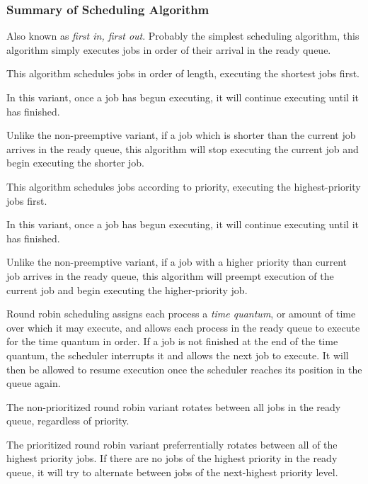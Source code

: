 \documentclass[12pt,letterpaper]{article}
\begin{document}
			\subsubsection{Summary of Scheduling Algorithm}
			\begin{description}[leftmargin=4cm, style=multiline]
					\item[First come, first served]{Also known as \textit{first in, first out}. Probably the simplest scheduling algorithm, this algorithm simply executes jobs in order of their arrival in the ready queue.}
					\item[Shortest job first]{This algorithm schedules jobs in order of length, executing the shortest jobs first.}
						\begin{description}[style=nextline, font=\normalfont\itshape]
							\item[non-preemptive]{In this variant, once a job has begun executing, it will continue executing until it has finished.}
							\item[preemptive]{Unlike the non-preemptive variant, if a job which is shorter than the current job arrives in the ready queue, this algorithm will stop executing the current job and begin executing the shorter job.}
						\end{description}
					\item[Priority]{This algorithm schedules jobs according to priority, executing the highest-priority jobs first.}
						\begin{description}[style=nextline, font=\normalfont\itshape]
							\item[non-preemptive]{In this variant, once a job has begun executing, it will continue executing until it has finished.}
							\item[preemptive]{Unlike the non-preemptive variant, if a job with a higher priority than current job arrives in the ready queue, this algorithm will preempt execution of the current job and begin executing the higher-priority job.}
						\end{description}
					\item[Round robin]{Round robin scheduling assigns each process a \textit{time quantum}, or amount of time over which it may execute, and allows each process in the ready queue to execute for the time quantum in order. If a job is not finished at the end of the time quantum, the scheduler interrupts it and allows the next job to execute. It will then be allowed to resume execution once the scheduler reaches its position in the queue again.}
						\begin{description}[style=nextline, font=\normalfont\itshape]
							\item[non-prioritized]{The non-prioritized round robin variant rotates between all jobs in the ready queue, regardless of priority.}
							\item[prioritized]{The prioritized round robin variant preferrentially rotates between all of the highest priority jobs. If there are no jobs of the highest priority in the ready queue, it will try to alternate between jobs of the next-highest priority level.} 
						\end{description}
				\end{description}
\end{document}
